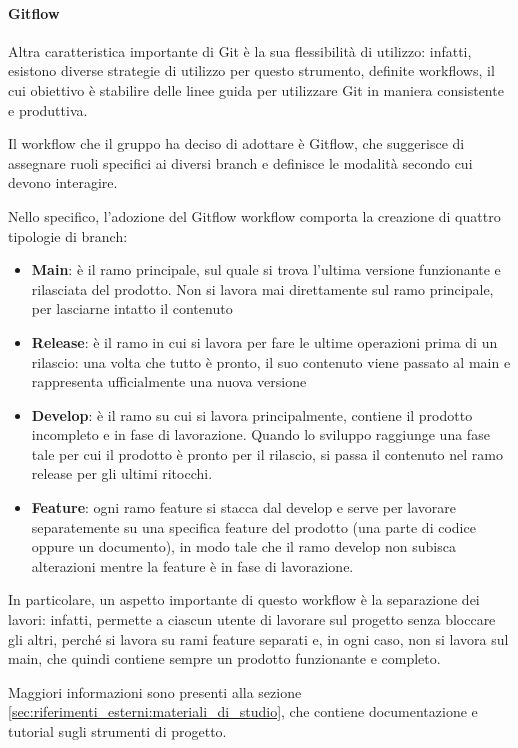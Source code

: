 \paragraph{Gitflow}
Altra caratteristica importante di Git è la sua flessibilità di utilizzo: infatti, esistono diverse strategie di utilizzo per questo strumento, definite workflows, il cui obiettivo è stabilire delle linee guida per utilizzare Git in maniera consistente e produttiva.
\par Il workflow che il gruppo ha deciso di adottare è Gitflow, che suggerisce di assegnare ruoli specifici ai diversi branch e definisce le modalità secondo cui devono interagire.
\par Nello specifico, l'adozione del Gitflow workflow comporta la creazione di quattro tipologie di branch:
\begin{itemize}
    \item \textbf{Main}: è il ramo principale, sul quale si trova l'ultima versione funzionante e rilasciata del prodotto. Non si lavora mai direttamente sul ramo principale, per lasciarne intatto il contenuto
    \item \textbf{Release}: è il ramo in cui si lavora per fare le ultime operazioni prima di un rilascio: una volta che tutto è pronto, il suo contenuto viene passato al main e rappresenta ufficialmente una nuova versione
    \item \textbf{Develop}: è il ramo su cui si lavora principalmente, contiene il prodotto incompleto e in fase di lavorazione. Quando lo sviluppo raggiunge una fase tale per cui il prodotto è pronto per il rilascio, si passa il contenuto nel ramo release per gli ultimi ritocchi.
    \item \textbf{Feature}: ogni ramo feature si stacca dal develop e serve per lavorare separatemente su una specifica feature del prodotto (una parte di codice oppure un documento), in modo tale che il ramo develop non subisca alterazioni mentre la feature è in fase di lavorazione.
\end{itemize}
In particolare, un aspetto importante di questo workflow è la separazione dei lavori: infatti, permette a ciascun utente di lavorare sul progetto senza bloccare gli altri, perché si lavora su rami feature separati e, in ogni caso, non si lavora sul main, che quindi contiene sempre un prodotto funzionante e completo.
\par Maggiori informazioni sono presenti alla sezione \ref{sec:riferimenti_esterni:materiali_di_studio}, che contiene documentazione e tutorial sugli strumenti di progetto.


